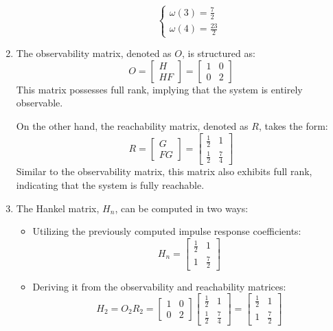 \begin{enumerate}
\begin{itemize}
\[\begin{cases}
                    \omega(3)=\frac{7}{2} \\
                    \omega(4)=\frac{23}{2}
                \end{cases}\]
        \end{itemize}
    \item The observability matrix, denoted as $O$, is structured as:
        \[O=\begin{bmatrix} H \\ HF \end{bmatrix}=\begin{bmatrix} 1 & 0 \\ 0 & 2 \end{bmatrix}\]
        This matrix possesses full rank, implying that the system is entirely observable.
        
        On the other hand, the reachability matrix, denoted as $R$, takes the form:
        \[R=\begin{bmatrix} G \\ FG \end{bmatrix}=\begin{bmatrix} \frac{1}{2} & 1 \\ \frac{1}{2} & \frac{7}{4} \end{bmatrix}\]
        Similar to the observability matrix, this matrix also exhibits full rank, indicating that the system is fully reachable.
    \item The Hankel matrix, $H_n$, can be computed in two ways: 
        \begin{itemize}
            \item Utilizing the previously computed impulse response coefficients:
                \[H_n=\begin{bmatrix} \frac{1}{2} & 1 \\ 1 & \frac{7}{2} \end{bmatrix}\]
            \item Deriving it from the observability and reachability matrices:
                \[H_2=O_2R_2=\begin{bmatrix} 1 & 0 \\ 0 & 2 \end{bmatrix}\begin{bmatrix} \frac{1}{2} & 1 \\ \frac{1}{2} & \frac{7}{4} \end{bmatrix}=\begin{bmatrix} \frac{1}{2} & 1 \\ 1 & \frac{7}{2} \end{bmatrix}\]
        \end{itemize}
\end{enumerate}